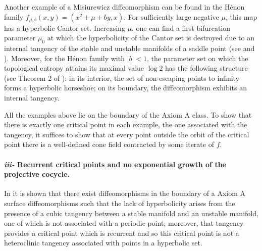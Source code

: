 \documentclass[a4paper,11pt]{article}
\theoremstyle{definition}
\begin{document}
Another example of a Misiurewicz diffeomorphism can be found in the H\'enon family $ f_{\mu,b}(x,y)=(x^2+\mu+by,x)$.  For sufficiently large negative $\mu$, this map has a hyperbolic Cantor set. Increasing $\mu$, one can find a first bifurcation parameter $\mu_0$ at which the hyperbolicity of the Cantor set is destroyed due to an internal tangency of the stable and unstable manifolds of a saddle point (see \cite{T} and \cite{BS2}).
Moreover, for the H\'enon family with $|b|<1$, the parameter set on which the topological entropy attains its maximal value $\log 2$ has the following structure (see Theorem 2 of \cite{BS}): in its interior, the set of non-escaping points to infinity forms a hyperbolic horseshoe; on its boundary, the diffeomorphism exhibits an internal tangency.


All the examples above lie on the boundary of the Axiom A class. To show that there is exactly one critical point in each example, the one associated with the tangency, it suffices to show that at every point outside the orbit of the critical point there is a well-defined cone field contracted by some iterate of $f$.





\paragraph{{\em iii-} Recurrent critical points and no exponential growth of the projective cocycle.} In \cite{HMS} it is shown that there exist diffeomorphisms in the boundary of a Axiom A surface diffeomorphisms such that the lack of hyperbolicity arises from the presence of a cubic tangency between a stable manifold and an unstable manifold, one of which is not associated with a periodic point; moreover, that tangency provides a critical point which is recurrent and so this critical point is not a heteroclinic tangency associated with points in a hyperbolic set.  
\end{document}
